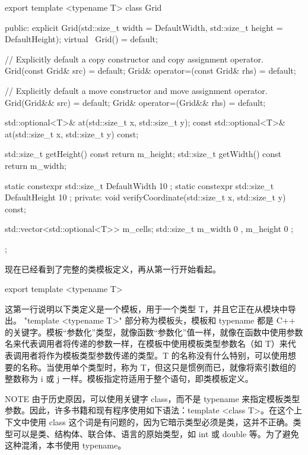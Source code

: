 \begin{cpp}
export template <typename T>
class Grid
{
    public:
        explicit Grid(std::size_t width = DefaultWidth,
            std::size_t height = DefaultHeight);
        virtual ~Grid() = default;

        // Explicitly default a copy constructor and copy assignment operator.
        Grid(const Grid& src) = default;
        Grid& operator=(const Grid& rhs) = default;

        // Explicitly default a move constructor and move assignment operator.
        Grid(Grid&& src) = default;
        Grid& operator=(Grid&& rhs) = default;

        std::optional<T>& at(std::size_t x, std::size_t y);
        const std::optional<T>& at(std::size_t x, std::size_t y) const;

        std::size_t getHeight() const { return m_height; }
        std::size_t getWidth() const { return m_width; }

        static constexpr std::size_t DefaultWidth { 10 };
        static constexpr std::size_t DefaultHeight { 10 };
    private:
        void verifyCoordinate(std::size_t x, std::size_t y) const;

        std::vector<std::optional<T>> m_cells;
        std::size_t m_width { 0 }, m_height { 0 };
};
\end{cpp}

现在已经看到了完整的类模板定义，再从第一行开始看起。

\begin{cpp}
export template <typename T>
\end{cpp}

这第一行说明以下类定义是一个模板，用于一个类型 T，并且它正在从模块中导出。 "template <typename T>" 部分称为模板头，模板和 typename 都是 C++ 的关键字。模板“参数化”类型，就像函数“参数化”值一样，就像在函数中使用参数名来代表调用者将传递的参数一样，在模板中使用模板类型参数名（如 T）来代表调用者将作为模板类型参数传递的类型。T 的名称没有什么特别，可以使用想要的名称。当使用单个类型时，称为 T，但这只是惯例而已，就像将索引数组的整数称为 i 或 j 一样。模板指定符适用于整个语句，即类模板定义。

\begin{myNotic}{NOTE}
由于历史原因，可以使用关键字 class，而不是 typename 来指定模板类型参数。因此，许多书籍和现有程序使用如下语法：template <class T>。在这个上下文中使用 class 这个词是有问题的，因为它暗示类型必须是类，这并不正确。类型可以是类、结构体、联合体、语言的原始类型，如 int 或 double 等。为了避免这种混淆，本书使用 typename。
\end{myNotic}

